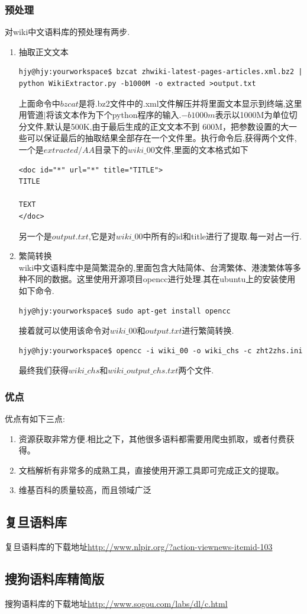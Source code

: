 \subsubsection{预处理}
对wiki中文语料库的预处理有两步.
\begin{enumerate}
\item 抽取正文文本\\
\begin{lstlisting}[style=BASH]
hjy@hjy:yourworkspace$ bzcat zhwiki-latest-pages-articles.xml.bz2 | python WikiExtractor.py -b1000M -o extracted >output.txt
\end{lstlisting}
上面命令中$bzcat$是将.bz2文件中的.xml文件解压并将里面文本显示到终端,这里用管道$|$将该文本作为下个python程序的输入.$-b1000m$表示以1000M为单位切分文件,默认是500K,由于最后生成的正文文本不到 600M，把参数设置的大一些可以保证最后的抽取结果全部存在一个文件里。执行命令后,获得两个文件,一个是$extracted/AA$目录下的$wiki\_00$文件,里面的文本格式如下
\begin{lstlisting}[style=XML]
<doc id="*" url="*" title="TITLE">
TITLE

TEXT
</doc>
\end{lstlisting}
另一个是$output.txt$,它是对$wiki\_00$中所有的id和title进行了提取.每一对占一行.


\item 繁简转换\\
wiki中文语料库中是简繁混杂的,里面包含大陆简体、台湾繁体、港澳繁体等多种不同的数据。这里使用开源项目opencc进行处理.其在ubuntu上的安装使用如下命令.
\begin{lstlisting}[style=BASH]
hjy@hjy:yourworkspace$ sudo apt-get install opencc
\end{lstlisting}
接着就可以使用该命令对$wiki\_00$和$output.txt$进行繁简转换.
\begin{lstlisting}[style=BASH]
hjy@hjy:yourworkspace$ opencc -i wiki_00 -o wiki_chs -c zht2zhs.ini
\end{lstlisting}
最终我们获得$wiki\_chs$和$wiki\_output\_chs.txt$两个文件.
\end{enumerate}

\subsubsection{优点}
优点有如下三点:
\begin{enumerate}
\item 资源获取非常方便.相比之下，其他很多语料都需要用爬虫抓取，或者付费获得。
\item 文档解析有非常多的成熟工具，直接使用开源工具即可完成正文的提取。
\item 维基百科的质量较高，而且领域广泛
\end{enumerate}

\subsection{复旦语料库}
复旦语料库的下载地址\url{http://www.nlpir.org/?action-viewnews-itemid-103}


\subsection{搜狗语料库精简版}
搜狗语料库的下载地址\url{http://www.sogou.com/labs/dl/c.html}

